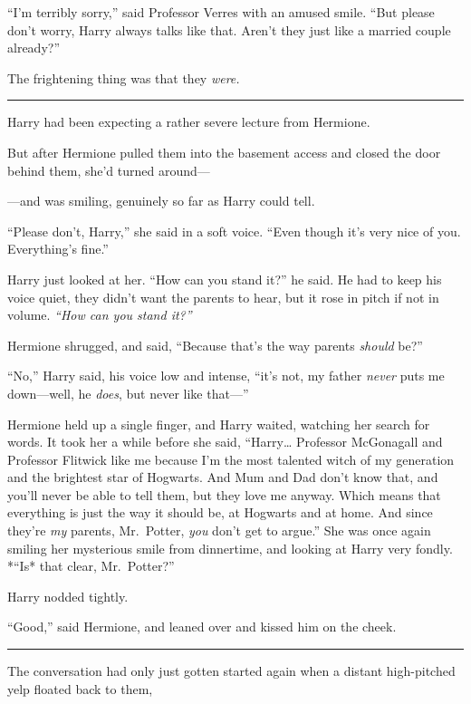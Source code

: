 ``I'm terribly sorry,'' said Professor Verres with an amused smile.
``But please don't worry, Harry always talks like that. Aren't they just
like a married couple already?''

The frightening thing was that they \emph{were.}

\begin{center}\rule{3in}{0.4pt}\end{center}

Harry had been expecting a rather severe lecture from Hermione.

But after Hermione pulled them into the basement access and closed the
door behind them, she'd turned around---

---and was smiling, genuinely so far as Harry could tell.

``Please don't, Harry,'' she said in a soft voice. ``Even though it's
very nice of you. Everything's fine.''

Harry just looked at her. ``How can you stand it?'' he said. He had to
keep his voice quiet, they didn't want the parents to hear, but it rose
in pitch if not in volume. \emph{``How can you stand it?''}

Hermione shrugged, and said, ``Because that's the way parents
\emph{should} be?''

``No,'' Harry said, his voice low and intense, ``it's not, my father
\emph{never} puts me down---well, he \emph{does}, but never like
that---''

Hermione held up a single finger, and Harry waited, watching her search
for words. It took her a while before she said, ``Harry\ldots{}
Professor McGonagall and Professor Flitwick like me because I'm the most
talented witch of my generation and the brightest star of Hogwarts. And
Mum and Dad don't know that, and you'll never be able to tell them, but
they love me anyway. Which means that everything is just the way it
should be, at Hogwarts and at home. And since they're \emph{my} parents,
Mr.~Potter, \emph{you} don't get to argue.'' She was once again smiling
her mysterious smile from dinnertime, and looking at Harry very fondly.
*``Is* that clear, Mr.~Potter?''

Harry nodded tightly.

``Good,'' said Hermione, and leaned over and kissed him on the cheek.

\begin{center}\rule{3in}{0.4pt}\end{center}

The conversation had only just gotten started again when a distant
high-pitched yelp floated back to them,

